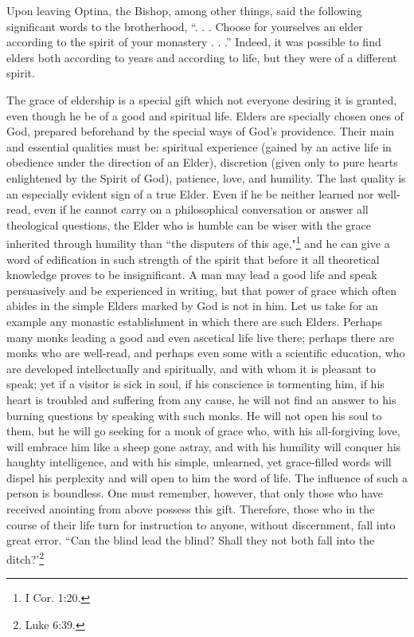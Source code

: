 Upon leaving Optina, the Bishop, among other things, said the following significant words to the brotherhood, “. . . Choose for yourselves an elder according to the spirit of your monastery . . .” Indeed, it was possible to find elders both according to years and according to life, but they were of a different spirit.

The grace of eldership is a special gift which not everyone desiring it is granted, even though he be of a good and spiritual life. Elders are specially chosen ones of God, prepared beforehand by the special ways of God's providence. Their main and essential qualities must be: spiritual experience (gained by an active life in obedience under the direction of an Elder), discretion (given only to pure hearts enlightened by the Spirit of God), patience, love, and humility. The last quality is an especially evident sign of a true Elder. Even if he be neither learned nor well-read, even if he cannot carry on a philosophical conversation or answer all theological questions, the Elder who is humble can be wiser with the grace inherited through humility than “the disputers of this age,"\footnote{I Cor. 1:20.} and he can give a word of edification in such strength of the spirit that before it all theoretical knowledge proves to be insignificant. A man may lead a good life and speak persuasively and be experienced in writing, but that power of grace which often abides in the simple Elders marked by God is not in him. Let us take for an example any monastic establishment in which there are such Elders. Perhaps many monks leading a good and even ascetical life live there; perhaps there are monks who are well-read, and perhaps even some with a scientific education, who are developed intellectually and spiritually, and with whom it is pleasant to speak; yet if a visitor is sick in soul, if his conscience is tormenting him, if his heart is troubled and suffering from any cause, he will not find an answer to his burning questions by speaking with such monks. He will not open his soul to them, but he will go seeking for a monk of grace who, with his all-forgiving love, will embrace him like a sheep gone astray, and with his humility will conquer his haughty intelligence, and with his simple, unlearned, yet grace-filled words will dispel his perplexity and will open to him the word of life. The influence of such a person is boundless. One must remember, however, that only those who have received anointing from above possess this gift. Therefore, those who in the course of their life turn for instruction to anyone, without discernment, fall into great error. “Can the blind lead the blind? Shall they not both fall into the ditch?'\footnote{Luke 6:39.}

